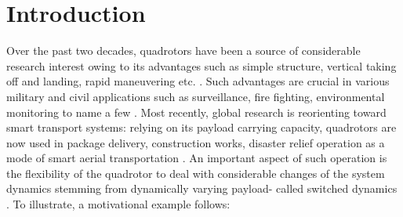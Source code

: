 \documentclass[AMA,STIX1COL,sort, compress]{WileyNJD-v2}
\begin{document}

\section{Introduction}

Over the past two decades, quadrotors have been a source of considerable research interest owing to its advantages such as simple structure, vertical taking off and landing, rapid maneuvering etc. \cite{du2013frequency}. Such advantages are crucial in various military and civil applications such as surveillance, fire fighting, environmental monitoring to name a few \cite{lugo2014framework}. Most recently, global research is reorienting toward smart transport systems: relying on its payload carrying capacity, quadrotors are now used in package delivery, construction works, disaster relief operation as a mode of smart aerial transportation \cite{tang2015mixed, yang2019energy}. An important aspect of such operation is the flexibility of the quadrotor to deal with considerable changes of the system dynamics stemming from dynamically varying payload- called switched dynamics \cite{liberzon2003switching}. To illustrate, a motivational example follows:
\end{document}
